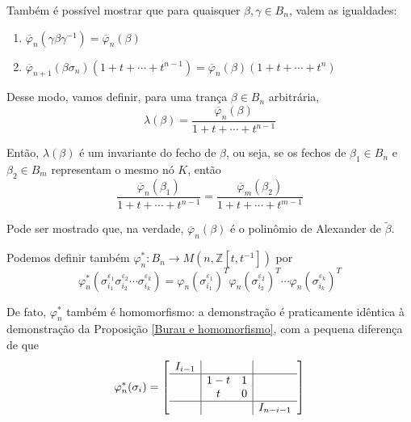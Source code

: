 \documentclass[a4paper,portuguese,11pt,twoside, leqno]{book}
\theoremstyle{definition}
\begin{document}
	\par\vspace{0.3cm} Também é possível mostrar que para quaisquer $\beta, \gamma\in B_n$, valem as igualdades:
	\begin{enumerate}
		\item $\overline{\varphi}_n(\gamma\beta\gamma^{-1}) = \overline{\varphi}_n(\beta)$
		\item $\overline{\varphi}_{n+1}(\beta\sigma_n)(1+t+\cdots+t^{n-1}) = \overline{\varphi}_n(\beta)(1+t+\cdots+t^n)$
	\end{enumerate}
	\par\vspace{0.3cm} Desse modo, vamos definir, para uma trança $\beta\in B_n$ arbitrária, 
	\begin{equation*}
	\lambda(\beta) = \frac{\overline{\varphi}_n(\beta)}{1+t+\cdots+t^{n-1}}
	\end{equation*} 
	\par\vspace{0.3cm} Então, $\lambda(\beta)$ é um invariante do fecho de $\beta$, ou seja, se os fechos de $\beta_1\in B_n$ e $\beta_2\in B_m$ representam o mesmo nó $K$, então
	\begin{equation*}
	\frac{\overline{\varphi}_n(\beta_1)}{1+t+\cdots+t^{n-1}} = \frac{\overline{\varphi}_m(\beta_2)}{1+t+\cdots+t^{m-1}}
	\end{equation*}
	\par\vspace{0.3cm} Pode ser mostrado que, na verdade, $\overline{\varphi}_n(\beta)$ é o polinômio de Alexander de $\widetilde{\beta}$.
	\par\vspace{0.3cm} Podemos definir também $\varphi_n^\ast: B_n\to M(n, \mathbb{Z}[t,t^{-1}])$ por
	\begin{equation*}
	\varphi_n^\ast(\sigma_{i_1}^{\varepsilon_1}\sigma_{i_2}^{\varepsilon_2}\cdots\sigma_{i_k}^{\varepsilon_k}) = \varphi_n(\sigma_{i_1}^{\varepsilon_1})^T\varphi_n(\sigma_{i_2}^{\varepsilon_2})^T\cdots\varphi_n(\sigma_{i_k}^{\varepsilon_k})^T
	\end{equation*}
	\par\vspace{0.3cm} De fato, $\varphi_n^\ast$ também é homomorfismo: a demonstração é praticamente idêntica à demonstração da Proposição \eqref{Burau e homomorfismo}, com a pequena diferença de que 
	\begin{equation}
	\label{phi estrela}
	\varphi_n^\ast(\sigma_i) = 
	\left[ 
	\begin{array}{c|cc|c}
	I_{i-1} &  &  & \\
	\hline 
	& 1-t & 1 &  \\
	& t & 0 &  \\ 
	\hline
	&  &  & I_{n-i-1}
	\end{array}
	\right] 
	\end{equation}
\end{document}
